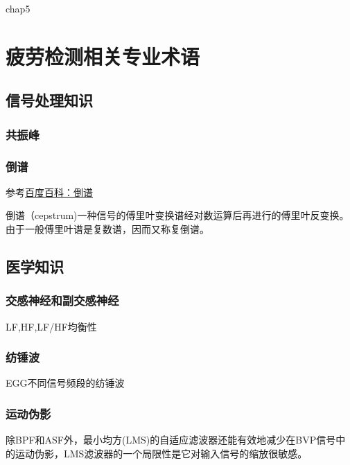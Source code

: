 ﻿%
chap5\chapter{疲劳检测相关专业术语}

\section{信号处理知识}

\subsection{共振峰}

\subsection{倒谱}

参考\href{https://baike.baidu.com/item/%E5%80%92%E8%B0%B1/9851556?fr=aladdin}{百度百科：倒谱}

倒谱（cepstrum)一种信号的傅里叶变换谱经对数运算后再进行的傅里叶反变换。由于一般傅里叶谱是复数谱，因而又称复倒谱。


\section{医学知识}

\subsection{交感神经和副交感神经}
LF,HF,LF/HF均衡性

\subsection{纺锤波}
EGG不同信号频段的纺锤波

\subsection{运动伪影}

除BPF和ASF外，最小均方(LMS)的自适应滤波器还能有效地减少在BVP信号\cite{liu2018self}中的运动伪影，LMS滤波器的一个局限性是它对输入信号的缩放很敏感。

